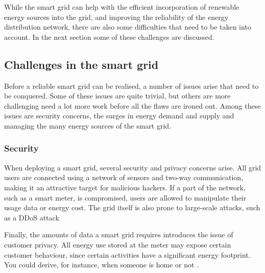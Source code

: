 While the smart grid can help with the efficient incorporation of renewable energy sources into the grid, and improving the reliability of the energy distribution network, there are also some difficulties that need to be taken into account. In the next section some of these challenges are discussed.


\subsection{Challenges in the smart grid} 
Before a reliable smart grid can be realised, a number of issues arise that need to be conquered. Some of these issues are quite trivial, but others are more challenging need a lot more work before all the flaws are ironed out. Among these issues are security concerns, the surges in energy demand and supply and managing the many energy sources of the smart grid.
 
\subsubsection{Security}
When deploying a smart grid, several security and privacy concerns arise. All grid users are connected using a network of sensors and two-way communication, making it an attractive target for malicious hackers. If a part of the network, such as a smart meter, is compromised, users are allowed to manipulate their usage data or energy cost. The grid itself is also prone to large-scale attacks, such as a DDoS attack \cite{McDanielMcLaughlin2009a}

Finally, the amounts of data a smart grid requires introduces the issue of customer privacy. All energy use stored at the meter may expose certain customer behaviour, since certain activities have a significant energy footprint. You could derive, for instance, when someone is home or not \cite{Molina-MarkhamShenoyFuEtAl2010}.

